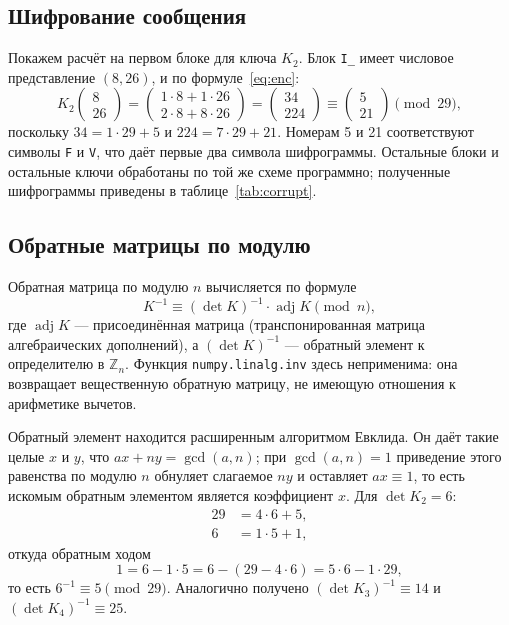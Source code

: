 \documentclass[a4paper,14pt]{extarticle}
\begin{document}
\subsection{Шифрование сообщения}

Покажем расчёт на первом блоке для ключа $K_2$. Блок \texttt{I\_} имеет числовое
представление $(8, 26)$, и по формуле~\eqref{eq:enc}:
\begin{equation}
  K_2 \begin{pmatrix} 8 \\ 26 \end{pmatrix}
  = \begin{pmatrix} 1\cdot 8 + 1\cdot 26 \\ 2\cdot 8 + 8\cdot 26 \end{pmatrix}
  = \begin{pmatrix} 34 \\ 224 \end{pmatrix}
  \equiv \begin{pmatrix} 5 \\ 21 \end{pmatrix} \pmod{29},
\end{equation}
поскольку $34 = 1\cdot 29 + 5$ и $224 = 7\cdot 29 + 21$. Номерам 5 и 21
соответствуют символы \texttt{F} и \texttt{V}, что даёт первые два символа
шифрограммы. Остальные блоки и остальные ключи обработаны по той же схеме
программно; полученные шифрограммы приведены в таблице~\ref{tab:corrupt}.

\subsection{Обратные матрицы по модулю}

Обратная матрица по модулю $n$ вычисляется по формуле
\begin{equation}
  K^{-1} \equiv (\det K)^{-1} \cdot \operatorname{adj} K \pmod n ,
  \label{eq:inv}
\end{equation}
где $\operatorname{adj} K$ --- присоединённая матрица (транспонированная матрица
алгебраических дополнений), а $(\det K)^{-1}$ --- обратный элемент к определителю
в $\mathbb{Z}_n$. Функция \texttt{numpy.linalg.inv} здесь неприменима: она
возвращает вещественную обратную матрицу, не имеющую отношения к арифметике вычетов.

Обратный элемент находится расширенным алгоритмом Евклида. Он даёт такие целые
$x$ и $y$, что $ax + ny = \gcd(a, n)$; при $\gcd(a, n) = 1$ приведение этого
равенства по модулю $n$ обнуляет слагаемое $ny$ и оставляет $ax \equiv 1$, то есть
искомым обратным элементом является коэффициент $x$. Для $\det K_2 = 6$:
\begin{align}
  29 &= 4\cdot 6 + 5, \\
   6 &= 1\cdot 5 + 1,
\end{align}
откуда обратным ходом
\begin{equation}
  1 = 6 - 1\cdot 5 = 6 - (29 - 4\cdot 6) = 5\cdot 6 - 1\cdot 29 ,
\end{equation}
то есть $6^{-1} \equiv 5 \pmod{29}$. Аналогично получено
$(\det K_3)^{-1} \equiv 14$ и $(\det K_4)^{-1} \equiv 25$.
\end{document}
